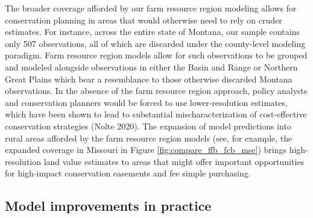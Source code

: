 \documentclass[12pt]{article}
\begin{document}
The broader coverage afforded by our farm resource region modeling allows for conservation planning in areas that would otherwise need to rely on cruder estimates. For instance, across the entire state of Montana, our sample contains only 507 observations, all of which are discarded under the county-level modeling paradigm. Farm resource region models allow for such observations to be grouped and modeled alongside observations in either the Basin and Range or Northern Great Plains which bear a resemblance to those otherwise discarded Montana observations. In the absence of the farm resource region approach, policy analysts and conservation planners would be forced to use lower-resolution estimates, which have been shown to lead to substantial mischaracterization of cost-effective conservation strategies (Nolte 2020). The expansion of model predictions into rural areas afforded by the farm resource region models (see, for example, the expanded coverage in Missouri in Figure \ref{fig:compare_ffb_fcb_mse}) brings high-resolution land value estimates to areas that might offer important opportunities for high-impact conservation easements and fee simple purchasing.

\subsection{Model improvements in practice} 
\end{document}
